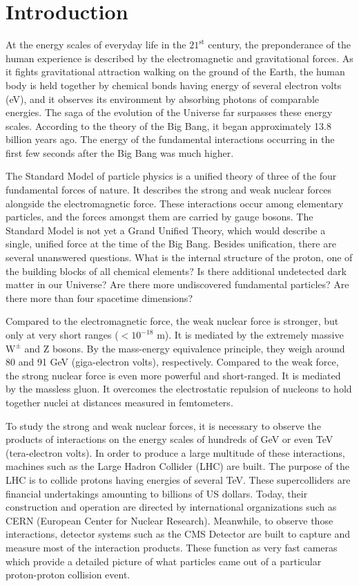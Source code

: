 \chapter{Introduction}
At the energy scales of everyday life in the $21^{\mathrm{st}}$ century, the preponderance of the human experience is described by the electromagnetic and gravitational forces.
As it fights gravitational attraction walking on the ground of the Earth,
the human body is held together by chemical bonds having energy of several electron volts (eV),
and it observes its environment by absorbing photons of comparable energies.
The saga of the evolution of the Universe far surpasses these energy scales.
According to the theory of the Big Bang, it began approximately 13.8 billion years ago.
The energy of the fundamental interactions occurring in the first few seconds after the Big Bang was much higher.

The Standard Model of particle physics is a unified theory of three of the four fundamental forces of nature.
It describes the strong and weak nuclear forces alongside the electromagnetic force.
These interactions occur among elementary particles, and the forces amongst them are carried by gauge bosons.
The Standard Model is not yet a Grand Unified Theory, which would describe a single, unified force at the time of the Big Bang.
Besides unification, there are several unanswered questions.
What is the internal structure of the proton, one of the building blocks of all chemical elements?
Is there additional undetected dark matter in our Universe?
Are there more undiscovered fundamental particles?
Are there more than four spacetime dimensions?

Compared to the electromagnetic force, the weak nuclear force is stronger, but only at very short ranges ($< 10^{{-}18}$ m).
It is mediated by the extremely massive $\mathrm{W^\pm}$ and Z bosons.
By the mass-energy equivalence principle, they weigh around 80 and 91 GeV (giga-electron volts), respectively.
Compared to the weak force, the strong nuclear force is even more powerful and short-ranged.
It is mediated by the massless gluon.
It overcomes the electrostatic repulsion of nucleons to hold together nuclei at distances measured in femtometers.

To study the strong and weak nuclear forces, it is necessary to observe
the products of interactions on the energy scales of hundreds of GeV or even TeV (tera-electron volts).
In order to produce a large multitude of these interactions,
machines such as the Large Hadron Collider (LHC) are built.
The purpose of the LHC is to collide protons having energies of several TeV.
These supercolliders are financial undertakings amounting to billions of US dollars.
Today, their construction and operation are directed by international organizations such as CERN (European Center for Nuclear Research).
Meanwhile, to observe those interactions, detector systems such as the CMS Detector are built to capture and measure most of the interaction products.
These function as very fast cameras which provide a detailed picture of what particles came out of a particular proton-proton collision event.

